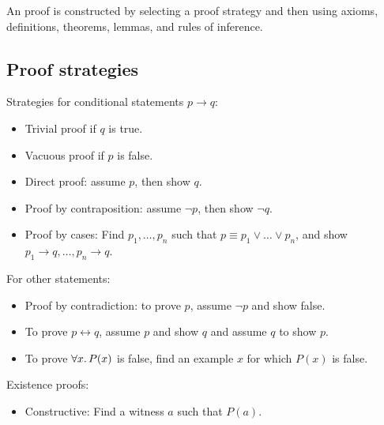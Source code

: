 An proof is constructed by selecting a proof strategy and then using axioms, definitions, theorems, lemmas, and rules of inference.

\subsection{Proof strategies}
Strategies for conditional statements \(p \rightarrow q\):
\begin{itemize}
    \item Trivial proof if \(q\) is true.
    \item Vacuous proof if \(p\) is false.
    \item Direct proof: assume \(p\), then show \(q\).
    \item Proof by contraposition: assume \(\neg p\), then show \(\neg q\).
    \item Proof by cases: Find \(p_1, \dots, p_n\) such that \(p \equiv p_1 \lor \dots \lor p_n\), and show \(p_1 \rightarrow q, \dots, p_n \rightarrow q\).
\end{itemize}
For other statements:
\begin{itemize}
    \item Proof by contradiction: to prove \(p\), assume \(\neg p\) and show false.
    \item To prove \(p \leftrightarrow q\), assume \(p\) and show \(q\) and assume \(q\) to show \(p\).
    \item To prove \(\forall x\ldotp P(x)\) is false, find an example \(x\) for which \(P(x)\) is false.
\end{itemize}
Existence proofs:
\begin{itemize}
    \item Constructive: Find a witness \(a\) such that \(P(a)\).
\end{itemize}
